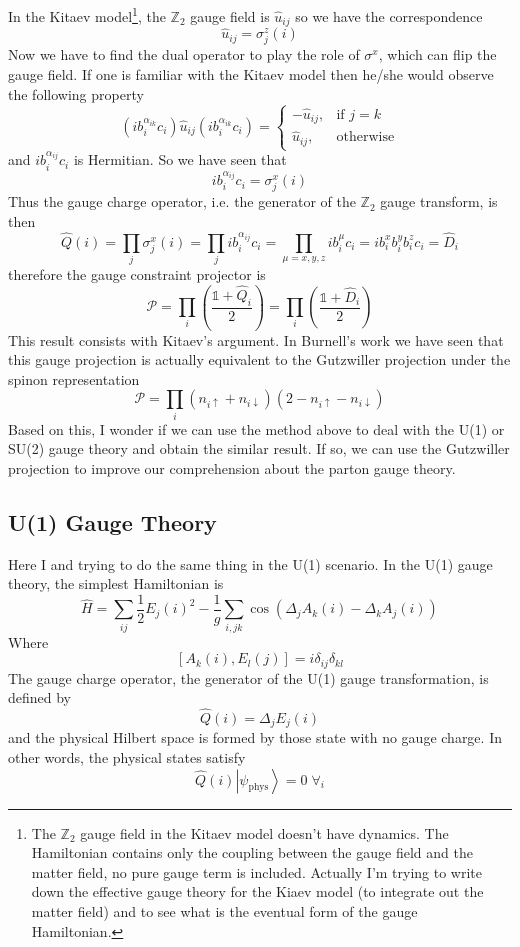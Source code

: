 \documentclass[12font]{article}
\newcommand{\ket}[1]{\left| #1 \right\rangle}
\newcommand{\lr}[1]{\left(  #1  \right)}
\begin{document}
In the Kitaev model\footnote{The $\mathbb{Z}_2$ gauge field in the Kitaev model doesn't have dynamics. The Hamiltonian contains only the coupling between the gauge field and the matter field, no pure gauge term is included. Actually I'm trying to write down the effective gauge theory for the Kiaev model (to integrate out the matter field) and to see what is the eventual form of the gauge Hamiltonian.}, the $\mathbb{Z}_2$ gauge field is $\hat{u}_{ij}$ so we have the correspondence 
\[\hat{u}_{ij} =  \sigma^z_j(i)\]
Now we have to find the dual operator to play the role of $\sigma^x$, which can flip the gauge field. If one is familiar with the Kitaev model then he/she would observe the following property
\[(ib^{\alpha_{ik}}_ic_i)\hat{u}_{ij}(ib^{\alpha_{ik}}_ic_i) = \begin{cases}
                                                                 -\hat{u}_{ij}, & \mbox{if } j=k \\
                                                                 \hat{u}_{ij}, & \mbox{otherwise}
                                                               \end{cases}\]
and $ib^{\alpha_{ij}}_ic_i$ is Hermitian. So we have seen that 
\[ib^{\alpha_{ij}}_ic_i = \sigma^x_j(i)\]
Thus the gauge charge operator, i.e. the generator of the $\mathbb{Z}_2$ gauge transform, is then
\begin{equation}\label{D operator.e}
  \hat{Q}(i) = \prod_{j}\sigma^x_j(i) = \prod_{j}ib^{\alpha_{ij}}_ic_i = \prod_{\mu = x,y,z}ib^{\mu}_ic_i = ib^x_ib^y_ib^z_ic_i = \hat{D}_i
\end{equation}
therefore the gauge constraint projector is
\[\mathcal{P} = \prod_{i}\lr{\frac{\mathds{1}+\hat{Q}_i}{2}} = \prod_{i}\lr{\frac{\mathds{1}+\hat{D}_i}{2}}\]
This result consists with Kitaev's argument. In Burnell's work we have seen that this gauge projection is actually equivalent to the Gutzwiller projection under the spinon representation
\[\mathcal{P} = \prod_{i}\lr{n_{i\uparrow} + n_{i\downarrow}}\lr{2-n_{i\uparrow} - n_{i\downarrow}}\]
Based on this, I wonder if we can use the method above to deal with the U(1) or SU(2) gauge theory and obtain the similar result. If so, we can use the Gutzwiller projection to improve our comprehension about the parton gauge theory.

\subsection{U(1) Gauge Theory}
Here I and trying to do the same thing in the U(1) scenario. In the U(1) gauge theory, the simplest Hamiltonian is
\[\hat{H} = \sum_{ij}\frac{1}{2}E_j(i)^2 - \frac{1}{g}\sum_{i,jk}\cos\lr{\Delta_jA_k(i) - \Delta_kA_j(i)}\]
Where
\[[A_k(i),E_l(j)] = i\delta_{ij}\delta_{kl}\] 
The gauge charge operator, the generator of the U(1) gauge transformation, is defined by
\[\hat{Q}(i) = \Delta_jE_j(i)\]
and the physical Hilbert space is formed by those state with no gauge charge. In other words, the physical states satisfy
\[\hat{Q}(i)\ket{\psi_{\text{phys}}} = 0\;\forall_i\]
\end{document}
